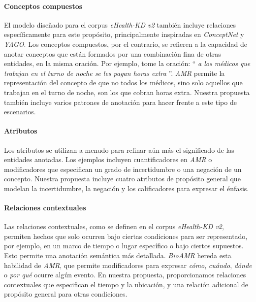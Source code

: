 \paragraph{Conceptos compuestos}

El modelo diseñado para el corpus \textit{eHealth-KD v2} también incluye relaciones específicamente para este propósito, principalmente inspiradas en \textit{ConceptNet} y \textit{YAGO}.
Los conceptos compuestos, por el contrario, se refieren a la capacidad de anotar conceptos que están formados por una combinación fina de otras entidades, en la misma oración. Por ejemplo, tome la oración: `` \textit{a los médicos que trabajan en el turno de noche se les pagan horas extra} ''. \textit{AMR} permite la representación del concepto de que no todos los médicos, sino solo aquellos que trabajan en el turno de noche, son los que cobran horas extra. Nuestra propuesta también incluye varios patrones de anotación para hacer frente a este tipo de escenarios.

\paragraph{Atributos}

Los atributos se utilizan a menudo para refinar aún más el significado de las entidades anotadas. Los ejemplos incluyen cuantificadores en \textit{AMR} o modificadores que especifican un grado de incertidumbre o una negación de un concepto. Nuestra propuesta incluye cuatro atributos de propósito general que modelan la incertidumbre, la negación y los calificadores para expresar el énfasis.

\paragraph{Relaciones contextuales}

Las relaciones contextuales, como se definen en el corpus \textit{eHealth-KD v2}, permiten hechos que solo ocurren
bajo ciertas condiciones para ser representado, por ejemplo, en un marco de tiempo o lugar específico o bajo ciertos supuestos. Esto permite una anotación semántica más detallada. \textit{BioAMR} hereda esta habilidad de \textit{AMR}, que permite modificadores para expresar \textit{cómo}, \textit{cuándo}, \textit{dónde} o \textit{por qué} ocurre algún evento. En nuestra propuesta, proporcionamos relaciones contextuales que especifican el tiempo y la ubicación, y una relación adicional de propósito general para otras condiciones.

